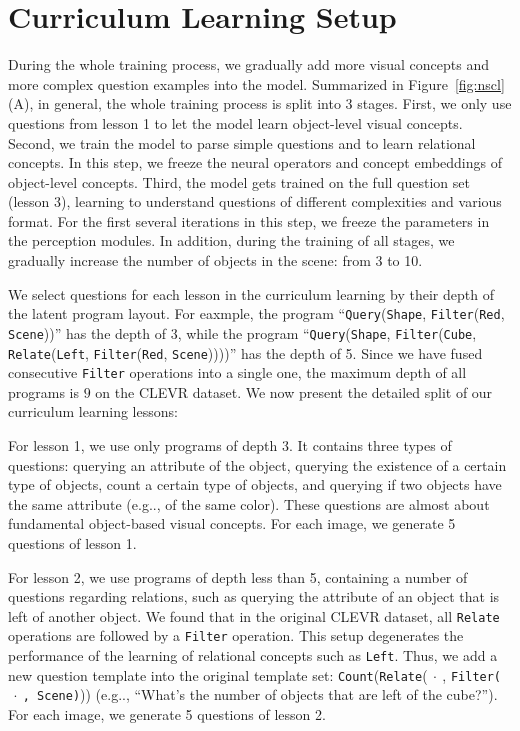 \documentclass{article} %
\makeatletter
\newcommand{\fig}[1]{Figure~\ref{#1}}
\DeclareRobustCommand\onedot{\futurelet\@let@token\@onedot}
\def\@onedot{\ifx\@let@token.\else.\null\fi\xspace}
\def\eg{e.g\onedot} \def\Eg{E.g\onedot}
\makeatother
\begin{document}
\section{Curriculum Learning Setup}
\label{sec:app:curriculum}

During the whole training process, we gradually add more visual concepts and more complex question examples into the model. 
Summarized in \fig{fig:nscl}(A), in general, the whole training process is split into 3 stages. 
First, we only use questions from lesson 1 to let the model learn object-level visual concepts. Second, we train the model to parse simple questions and to learn relational concepts. In this step, we freeze the neural operators and concept embeddings of object-level concepts. Third, the model gets trained on the full question set (lesson 3), learning to understand questions of different complexities and various format. For the first several iterations in this step, we freeze the parameters in the perception modules. In addition, during the training of all stages, we gradually increase the number of objects in the scene: from 3 to 10.

We select questions for each lesson in the curriculum learning by their depth of the latent program layout. For eaxmple, the program ``\texttt{Query}(\texttt{Shape}, \texttt{Filter}(\texttt{Red}, \texttt{Scene}))'' has the depth of 3, while the program  ``\texttt{Query}(\texttt{Shape},
\texttt{Filter}(\texttt{Cube}, \texttt{Relate}(\texttt{Left}, \texttt{Filter}(\texttt{Red}, \texttt{Scene}))))'' has the depth of 5. Since we have fused  consecutive \texttt{Filter} operations into a single one, the maximum depth of all programs is $9$ on the CLEVR dataset. We now present the detailed split of our curriculum learning lessons:

For lesson 1, we use only programs of depth 3. It contains three types of questions: querying an attribute of the object, querying the existence of a certain type of objects, count a certain type of objects, and querying if two objects have the same attribute (\eg, of the same color). These questions are almost about fundamental object-based visual concepts. For each image, we generate 5 questions of lesson 1.

For lesson 2, we use programs of depth less than 5, containing a number of questions regarding relations, such as querying the attribute of an object that is left of another object. We found that in the original CLEVR dataset, all \texttt{Relate} operations are followed by a \texttt{Filter} operation. This setup degenerates the performance of the learning of relational concepts such as \texttt{Left}. Thus, we add a new question template into the original template set: \texttt{Count}(\texttt{Relate}($~\cdot~$, \texttt{Filter($~\cdot~$, \texttt{Scene})})) (\eg, ``What's the number of objects that are left of the cube?''). For each image, we generate 5 questions of lesson 2.
\end{document}
